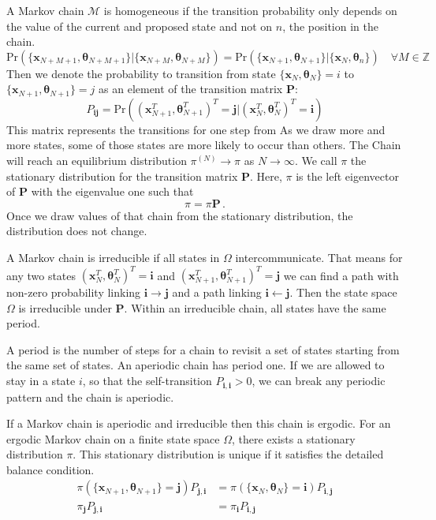 A Markov chain $\mathcal{M}$ is homogeneous if the transition probability only depends on the value of the current and proposed state and not on $n$, the position in the chain.
\begin{equation}
    \text{Pr}(\{ \bm{x}_{N+M+1}, \bm{\theta}_{N+M+1} \}| \{ \bm{x}_{N+M}, \bm{\theta}_{N+M} \}) = \text{Pr}(\{ \bm{x}_{N+1}, \bm{\theta}_{N+1} \}| \{ \bm{x}_N, \bm{\theta}_n \} ) \quad \forall M \in \mathbb{Z}
\end{equation}
Then we denote the probability to transition from state $\{ \bm{x}_N, \bm{\theta}_N \} = i$ to $\{ \bm{x}_{N+1}, \bm{\theta}_{N+1} \}= j $ as an element of the transition matrix $\bm{P}$:
\begin{equation}
    P_{\bm{i j}} =  \text{Pr}( ( \bm{x}^T_{N+1}, \bm{\theta}^T_{N+1} )^T = \bm{j}| ( \bm{x}^T_N, \bm{\theta}^T_N )^T  = \bm{i}) 
\end{equation}
This matrix represents the transitions for one step from
As we draw more and more states, some of those states are more likely to occur than others.
The Chain will reach an equilibrium distribution $\pi^{(N)} \rightarrow \pi$ as $N \rightarrow \infty$.
We call $\pi$ the stationary distribution for the transition matrix $\bm{P}$.
Here, $\pi$ is the left eigenvector of $\bm{P}$ with the eigenvalue one such that
\begin{equation}
    \pi = \pi \bm{P} \, .
\end{equation}
Once we draw values of that chain from the stationary distribution, the distribution does not change.


A Markov chain is irreducible if all states in $\Omega$ intercommunicate.
That means for any two states  $( \bm{x}_N^T, \bm{\theta}_N^T )^T = \bm{i}$ and $( \bm{x}^T_{N+1}, \bm{\theta}^T_{N+1} )^T= \bm{j} $ we can find a path with non-zero probability linking $\bm{i} \rightarrow \bm{j}$ and a path linking  $\bm{i} \leftarrow \bm{j}$.
Then the state space $\Omega$ is irreducible under $\bm{P}$.
Within an irreducible chain, all states have the same period.

A period is the number of steps for a chain to revisit a set of states starting from the same set of states.
An aperiodic chain has period one.
If we are allowed to stay in a state $i$, so that the self-transition  $P_{\bm{i,i}} > 0$, we can break any periodic pattern and the chain is aperiodic.

If a Markov chain is aperiodic and irreducible then this chain is ergodic.
For an ergodic Markov chain on a finite state space $\Omega$, there exists a stationary distribution $\pi$.
This stationary distribution is unique if it satisfies the detailed balance condition.
\begin{align}
    \pi(\{ \bm{x}_{N+1}, \bm{\theta}_{N+1} \} = \bm{j} ) P_{\bm{j,i}} &= \pi(\{ \bm{x}_N, \bm{\theta}_N \} = \bm{i}) P_{\bm{i,j}}\\
    \pi_{\bm{j}}  P_{\bm{j,i}} &= \pi_{\bm{i}} P_{\bm{i,j}}
\end{align}

